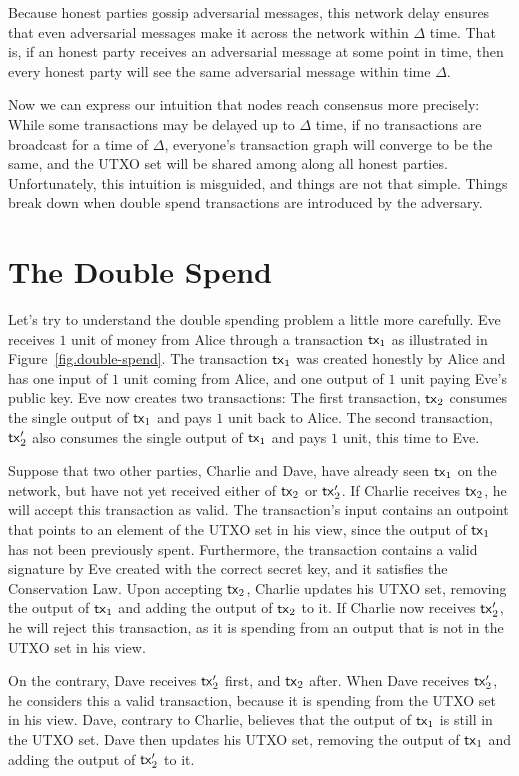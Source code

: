 Because honest parties gossip adversarial messages, this network delay ensures that
even adversarial messages make it across the network within $\Delta$ time. That is,
if an honest party receives an adversarial message at some point in time, then every
honest party will see the same adversarial message within time $\Delta$.

Now we can express our intuition that nodes reach consensus more precisely:
While some transactions may be delayed up to $\Delta$ time,
if no transactions are broadcast for a time of $\Delta$, everyone's transaction
graph will converge to be the same, and the UTXO set will be shared among along
all honest parties. Unfortunately, this intuition is misguided, and things are not
that simple. Things break down when double spend transactions are introduced
by the adversary.

\section{The Double Spend}

Let's try to understand the double spending problem a little more carefully. Eve
receives $1$ unit of money from Alice through a transaction $\mathsf{tx}_1$ as illustrated in
Figure~\ref{fig.double-spend}. The transaction $\mathsf{tx}_1$ was created honestly by Alice
and has one input of $1$ unit coming from Alice, and one output of $1$ unit paying
Eve's public key. Eve now creates two transactions: The first transaction, $\mathsf{tx}_2$
consumes the single output of $\mathsf{tx}_1$ and pays $1$ unit back to Alice. The second transaction,
$\mathsf{tx}_2'$ also consumes the single output of $\mathsf{tx}_1$ and pays $1$ unit, this time to Eve.

Suppose that two other parties, Charlie and Dave, have already seen $\mathsf{tx}_1$ on the network,
but have not yet received either of $\mathsf{tx}_2$ or $\mathsf{tx}_2'$. If Charlie receives $\mathsf{tx}_2$, he
will accept this transaction as valid. The transaction's input contains an outpoint that
points to an element of the UTXO set in his view, since the output of $\mathsf{tx}_1$ has not been
previously spent. Furthermore, the transaction contains a valid signature by Eve created
with the correct secret key, and it satisfies the Conservation Law. Upon accepting $\mathsf{tx}_2$,
Charlie updates his UTXO set, removing the output of $\mathsf{tx}_1$ and adding the output of
$\mathsf{tx}_2$ to it. If Charlie now receives $\mathsf{tx}_2'$, he will reject this transaction, as
it is spending from an output that is not in the UTXO set in his view.

On the contrary, Dave receives $\mathsf{tx}_2'$ first, and $\mathsf{tx}_2$ after. When Dave receives $\mathsf{tx}_2'$,
he considers this a valid transaction, because it is spending from the UTXO set in his view.
Dave, contrary to Charlie, believes that the output of $\mathsf{tx}_1$ is still in the UTXO set.
Dave then updates his UTXO set, removing the output of $\mathsf{tx}_1$ and adding the output
of $\mathsf{tx}_2'$ to it.

